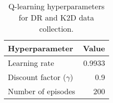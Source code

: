
\begin{table}[ht]
\centering
\label{table:bc_hyp}
\caption{Q-learning hyperparameters for DR and K2D data collection.}
\begin{tabular}{l|r}
\toprule
Hyperparameter & Value \\
\midrule
Learning rate & 0.9933 \\
Discount factor ($\gamma$) & 0.9\\
Number of episodes & 200\\
\bottomrule
\end{tabular}
\label{tab:q_learning_params}
\end{table}
